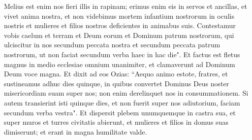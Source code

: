 \begin{biblechapter}
\verse Melius est enim nos fieri illis in rapinam; erimus enim eis in servos et ancillas, et vivet anima nostra, et non videbimus mortem infantium nostrorum in oculis nostris et mulieres et filios nostros deficientes in animabus suis.  
\verse Contestamur vobis caelum et terram et Deum eorum et Dominum patrum nostrorum, qui ulciscitur in nos secundum peccata nostra et secundum peccata patrum nostrorum, ut non faciat secundum verba haec in hac die". 
\verse Et factus est fletus magnus in medio ecclesiae omnium unanimiter, et clamaverunt ad Dominum Deum voce magna. 
\verse Et dixit ad eos Ozias: “Aequo animo estote, fratres, et sustineamus adhuc dies quinque, in quibus convertet Dominus Deus noster misericordiam suam super nos; non enim derelinquet nos in consummationem. 
\verse Si autem transierint isti quinque dies, et non fuerit super nos adiutorium, faciam secundum verba vestra". 
\verse Et dispersit plebem unumquemque in castra sua, et super muros et turres civitatis abierunt, et mulieres et filios in domus suas dimiserunt; et erant in magna humilitate valde. 
\end{biblechapter}

